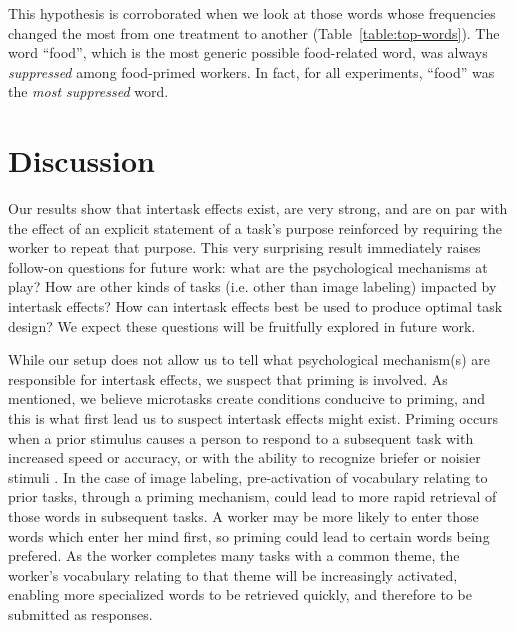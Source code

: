 \documentclass{sigchi}
\begin{document}
This hypothesis is corroborated when we look at those words whose 
frequencies changed the most from one treatment to another 
(Table~\ref{table:top-words}).  
The word ``food'', which is the most generic possible food-related word, was 
always \textit{suppressed} among food-primed workers.  In fact, 
for all experiments, ``food'' was the \textit{most suppressed} word.

\section{Discussion}
Our results show that intertask effects exist, are very strong, and are
on par with the effect of an explicit statement of a task's purpose 
reinforced by requiring the worker to repeat that purpose.  
This very surprising 
result immediately raises follow-on questions for future work: 
what are the psychological mechanisms at play? How are other kinds of 
tasks (i.e. other than image 
labeling) impacted by intertask effects?  How can intertask effects best 
be used to produce optimal task design?  We expect these questions will
be fruitfully explored in future work.

While our setup does not allow us to tell what psychological mechanism(s) 
are responsible for intertask effects, we suspect that priming is involved.
As mentioned, we believe microtasks create conditions conducive to priming,
and this is what first lead us to suspect intertask effects might exist.  
Priming occurs when a prior stimulus causes a person to respond to a 
subsequent task with increased speed or 
accuracy, or with the ability to recognize briefer or 
noisier stimuli \cite{BJOP1796,BJOP1826,Huber2008324}.
In the case of image labeling, pre-activation of 
vocabulary relating to prior tasks, through a priming mechanism, 
could lead to more rapid retrieval of those words in subsequent tasks.  
A worker may be more likely to enter those words which enter her mind 
first, so priming could lead to certain words being prefered.  
As the worker
completes many tasks with a common theme, the worker's vocabulary relating
to that theme will be increasingly activated, enabling more specialized
words to be retrieved quickly, and therefore to be submitted as responses.
\end{document}
